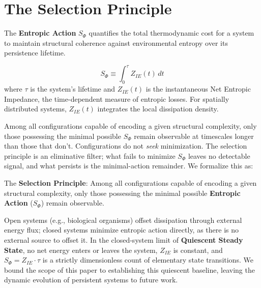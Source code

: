 \section{The Selection Principle}
The \textbf{Entropic Action} $S_\Phi$ quantifies the total thermodynamic cost for a system to maintain structural coherence against environmental entropy over its persistence lifetime. 

\begin{equation}\label{eq:entropic_action}
    S_\Phi \equiv \int_0^{\tau} Z_{IE}(t) \, dt
\end{equation}
\noindent where $\tau$ is the system's lifetime and $Z_{IE}(t)$ is the instantaneous Net Entropic Impedance, the time-dependent measure of entropic losses. For spatially distributed systems, $Z_{IE}(t)$ integrates the local dissipation density.

Among all configurations capable of encoding a given structural complexity, only those possessing the minimal possible $S_\Phi$ remain observable at timescales longer than those that don't. Configurations do not \emph{seek} minimization. The selection principle is an eliminative filter; what fails to minimize $S_\Phi$ leaves no detectable signal, and what persists is the minimal-action remainder. We formalize this as:

\begin{samepage}
\label{selection_principle}
\begin{mdframed}[linewidth=1pt,linecolor=black,backgroundcolor=gray!10]
    \noindent The \textbf{Selection Principle}: Among all configurations capable of encoding a given structural complexity, only those possessing the minimal possible \textbf{Entropic Action} ($S_\Phi$) remain observable.
\end{mdframed}
\end{samepage}

Open systems (e.g., biological organisms) offset dissipation through external energy flux; closed systems minimize entropic action directly, as there is no external source to offset it. In the closed-system limit of \textbf{Quiescent Steady State}, no net energy enters or leaves the system, $Z_{IE}$ is constant, and $S_\Phi = Z_{IE} \cdot \tau$ is a strictly dimensionless count of elementary state transitions. We bound the scope of this paper to establishing this quiescent baseline, leaving the dynamic evolution of persistent systems to future work.